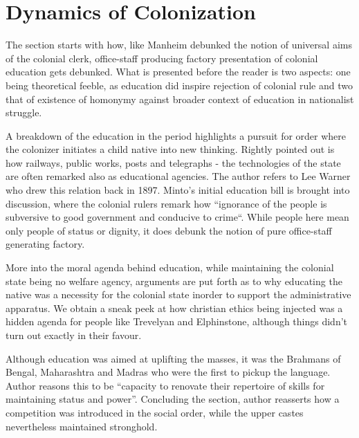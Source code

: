 \documentclass[a4paper,twocolumn]{article}
\begin{document}
\section{Dynamics of Colonization}
    
    The section starts with how, like Manheim debunked
    the notion of universal aims of the colonial clerk,
    office-staff producing factory presentation of
    colonial education gets debunked. What is presented
    before the reader is two aspects: one being
    theoretical feeble, as education did inspire
    rejection of colonial rule and two that of existence
    of homonymy against broader context of education in
    nationalist struggle.

    A breakdown of the education in the period
    highlights a pursuit for order where the colonizer
    initiates a child native into new thinking. Rightly
    pointed out is how railways, public works, posts and
    telegraphs - the technologies of the state are often
    remarked also as educational agencies. The author
    refers to Lee Warner who drew this relation back in
    1897. Minto's initial education bill is brought into
    discussion, where the colonial rulers remark how
    ``ignorance of the people is subversive to good
    government and conducive to crime``. While people
    here mean only people of status or dignity, it does
    debunk the notion of pure office-staff generating
    factory. 

    More into the moral agenda behind education, while
    maintaining the colonial state being no welfare
    agency, arguments are put forth as to why educating
    the native was a necessity for the colonial state
    inorder to support the administrative apparatus. We
    obtain a sneak peek at how christian ethics being
    injected was a hidden agenda for people like
    Trevelyan and Elphinstone, although things didn't
    turn out exactly in their favour.

    Although education was aimed at uplifting the
    masses, it was the Brahmans of Bengal, Maharashtra
    and Madras who were the first to pickup the
    language. Author reasons this to be ``capacity to
    renovate their repertoire of skills for maintaining
    status and power''. Concluding the section, author 
    reasserts how a competition was introduced in the
    social order, while the upper castes nevertheless
    maintained stronghold. 

\end{document}

